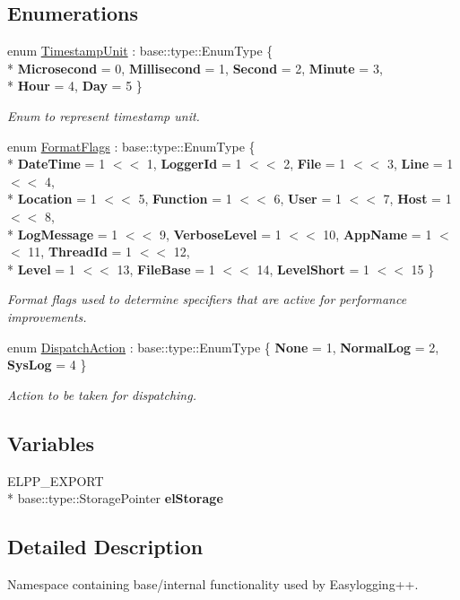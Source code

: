 \subsection*{Enumerations}
\begin{DoxyCompactItemize}
\item 
enum \hyperlink{namespaceel_1_1base_a1b886858c6409097395b24b1bdf03c39}{Timestamp\-Unit} \-: base\-::type\-::\-Enum\-Type \{ \\*
{\bfseries Microsecond} = 0, 
{\bfseries Millisecond} = 1, 
{\bfseries Second} = 2, 
{\bfseries Minute} = 3, 
\\*
{\bfseries Hour} = 4, 
{\bfseries Day} = 5
 \}
\begin{DoxyCompactList}\small\item\em Enum to represent timestamp unit. \end{DoxyCompactList}\item 
enum \hyperlink{namespaceel_1_1base_a28939c5a884e67fcf12259f4b8848e00}{Format\-Flags} \-: base\-::type\-::\-Enum\-Type \{ \\*
{\bfseries Date\-Time} = 1 $<$$<$ 1, 
{\bfseries Logger\-Id} = 1 $<$$<$ 2, 
{\bfseries File} = 1 $<$$<$ 3, 
{\bfseries Line} = 1 $<$$<$ 4, 
\\*
{\bfseries Location} = 1 $<$$<$ 5, 
{\bfseries Function} = 1 $<$$<$ 6, 
{\bfseries User} = 1 $<$$<$ 7, 
{\bfseries Host} = 1 $<$$<$ 8, 
\\*
{\bfseries Log\-Message} = 1 $<$$<$ 9, 
{\bfseries Verbose\-Level} = 1 $<$$<$ 10, 
{\bfseries App\-Name} = 1 $<$$<$ 11, 
{\bfseries Thread\-Id} = 1 $<$$<$ 12, 
\\*
{\bfseries Level} = 1 $<$$<$ 13, 
{\bfseries File\-Base} = 1 $<$$<$ 14, 
{\bfseries Level\-Short} = 1 $<$$<$ 15
 \}
\begin{DoxyCompactList}\small\item\em Format flags used to determine specifiers that are active for performance improvements. \end{DoxyCompactList}\item 
enum \hyperlink{namespaceel_1_1base_a3aa2563d38e47388ba242a1694fc2839}{Dispatch\-Action} \-: base\-::type\-::\-Enum\-Type \{ {\bfseries None} = 1, 
{\bfseries Normal\-Log} = 2, 
{\bfseries Sys\-Log} = 4
 \}
\begin{DoxyCompactList}\small\item\em Action to be taken for dispatching. \end{DoxyCompactList}\end{DoxyCompactItemize}
\subsection*{Variables}
\begin{DoxyCompactItemize}
\item 
\hypertarget{namespaceel_1_1base_a0ec6b7a1bd89ad58dadc10f190142018}{E\-L\-P\-P\-\_\-\-E\-X\-P\-O\-R\-T \\*
base\-::type\-::\-Storage\-Pointer {\bfseries el\-Storage}}\label{namespaceel_1_1base_a0ec6b7a1bd89ad58dadc10f190142018}

\end{DoxyCompactItemize}


\subsection{Detailed Description}
Namespace containing base/internal functionality used by Easylogging++. 